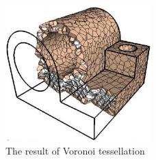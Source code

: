 \begin{figure}
        \centering
        \includegraphics[width=0.5\textwidth]{img/clippedresult}
        \caption{The result of Voronoi tessellation \cite{yan2010efficient}}
        \label{fig:voro}
\end{figure}

